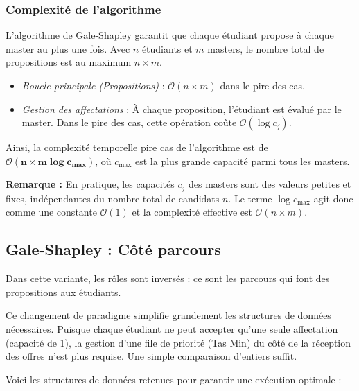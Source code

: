 \documentclass{article}
\begin{document}
\subsubsection{Complexité de l'algorithme}
L'algorithme de Gale-Shapley garantit que chaque étudiant propose à chaque master au plus une fois. Avec $n$ étudiants et $m$ masters, le nombre total de propositions est au maximum $n \times m$.

\begin{itemize}
    \item \textit{Boucle principale (Propositions)} : $\mathcal{O}(n \times m)$ dans le pire des cas.
    \item \textit{Gestion des affectations} : À chaque proposition, l'étudiant est évalué par le master. Dans le pire des cas, cette opération coûte $\mathcal{O}(\log c_j)$.
\end{itemize}

Ainsi, la complexité temporelle pire cas de l'algorithme est de $\mathbf{\mathcal{O}(n \times m \log c_{\max})}$, où $c_{\max}$ est la plus grande capacité parmi tous les masters.

\vspace{0.2cm}
\textbf{Remarque :} En pratique, les capacités $c_j$ des masters sont des valeurs petites et fixes, indépendantes du nombre total de candidats $n$. Le terme $\log c_{\max}$ agit donc comme une constante $\mathcal{O}(1)$ et la complexité effective est $\mathcal{O}(n \times m)$.






\subsection{Gale-Shapley : Côté parcours}

Dans cette variante, les rôles sont inversés : ce sont les parcours qui font des propositions aux étudiants. 

Ce changement de paradigme simplifie grandement les structures de données nécessaires. Puisque chaque étudiant ne peut accepter qu'une seule affectation (capacité de 1), la gestion d'une file de priorité (Tas Min) du côté de la réception des offres n'est plus requise. Une simple comparaison d'entiers suffit.

Voici les structures de données retenues pour garantir une exécution optimale :
\end{document}
